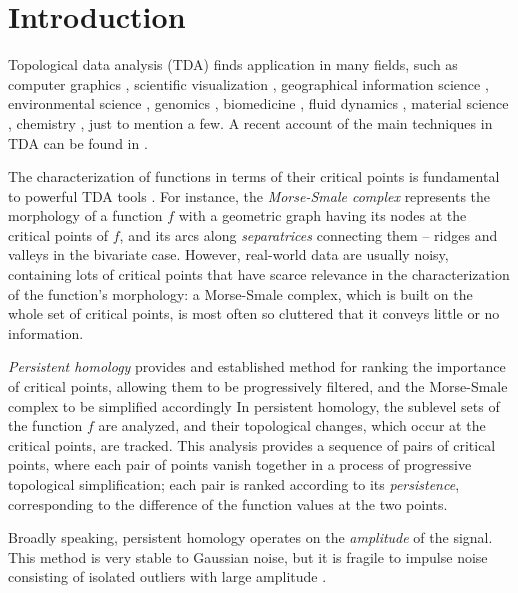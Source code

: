 

\section{Introduction}
Topological data analysis (TDA) finds application in many fields, such as computer graphics \cite{Weinkauf:2009}, scientific visualization \cite{Tierny:2017}, geographical information science \cite{Dey:2017,Rocca:2017fv,Xu:2020}, environmental science \cite{Valsangkar:2019}, genomics \cite{Rabadan_Blumberg_2019}, biomedicine \cite{SKAF2022}, fluid dynamics \cite{Gunther:2012,Sahner:2007}, material science \cite{Gyulassy:2007},  chemistry \cite{Olejniczak:2020}, just to mention a few. 
A recent account of the main techniques in TDA can be found in \cite{Dey_Wang_2022}.

The characterization of functions in terms of their critical points is fundamental to powerful TDA tools \cite{Dey_Wang_2022,Biasotti2008,Heine2016,ttk}. 
For instance, the \emph{Morse-Smale complex} \cite{Smale63} represents the morphology of a function $f$ with a geometric graph having its nodes at the critical points of $f$, and its arcs along  \emph{separatrices} connecting them -- ridges and valleys in the bivariate case. 
However, real-world data are usually noisy, containing lots of critical points that have scarce relevance in the characterization of the function's morphology: a Morse-Smale complex, which is built on the whole set of critical points, is most often so cluttered that it conveys little or no information.

\emph{Persistent homology} \cite{Edelsbrunner:2002ve,Edelsbrunner:2003dn} provides and established method for ranking the importance of critical points, allowing them to be progressively filtered, and the Morse-Smale complex to be simplified accordingly 
In persistent homology, the sublevel sets of the function $f$ are analyzed, and their topological changes, which occur at the critical points, are tracked.
This analysis provides a sequence of pairs of critical points, where each pair of points vanish together in a process of progressive topological simplification; each pair is ranked according to its \emph{persistence}, corresponding to the difference of the function values at the two points. 

Broadly speaking, persistent homology operates on the \emph{amplitude} of the signal.
This method is very stable to Gaussian noise, but it is fragile to impulse noise consisting of isolated outliers with large amplitude \cite{reininghaus11}.

